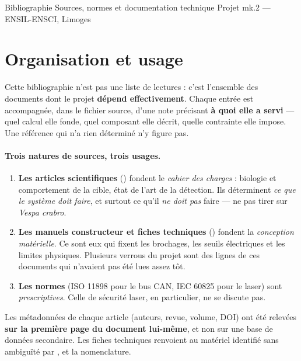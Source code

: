 \documentclass[11pt,a4paper]{article}
\begin{document}
\vespatitlepage
  {Bibliographie}
  {Sources, normes et documentation technique}
  {Projet \vespa{} mk.2 — ENSIL-ENSCI, Limoges}

\tableofcontents
\newpage

\section{Organisation et usage}

Cette bibliographie n'est pas une liste de lectures : c'est l'ensemble des documents dont le
projet \textbf{dépend effectivement}. Chaque entrée est accompagnée, dans le fichier source,
d'une note précisant \textbf{à quoi elle a servi} — quel calcul elle fonde, quel composant
elle décrit, quelle contrainte elle impose. Une référence qui n'a rien déterminé n'y figure
pas.

\paragraph{Trois natures de sources, trois usages.}

\begin{enumerate}
  \item \textbf{Les articles scientifiques} () fondent le
        \emph{cahier des charges} : biologie et comportement de la cible, état de l'art de la
        détection. Ils déterminent \emph{ce que le système doit faire}, et surtout ce qu'il
        \emph{ne doit pas} faire — ne pas tirer sur \emph{Vespa crabro}.
  \item \textbf{Les manuels constructeur et fiches techniques}
        () fondent la \emph{conception matérielle}. Ce
        sont eux qui fixent les brochages, les seuils électriques et les limites physiques.
        Plusieurs verrous du projet sont des lignes de ces documents qui n'avaient pas été
        lues assez tôt.
  \item \textbf{Les normes} (ISO 11898 pour le bus CAN, IEC 60825 pour le laser) sont
        \emph{prescriptives}. Celle de sécurité laser, en particulier, ne se discute pas.
\end{enumerate}

\begin{note}
Les métadonnées de chaque article (auteurs, revue, volume, DOI) ont été relevées
\textbf{sur la première page du document lui-même}, et non sur une base de données
secondaire. Les fiches techniques renvoient au matériel identifié sans ambiguïté par
,  et la nomenclature.
\end{note}
\end{document}
